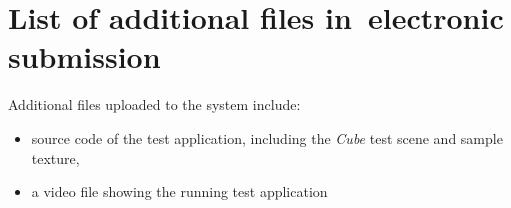 \chapter{List of additional files in~electronic submission}

Additional files uploaded to the system include:
\begin{itemize}
\item source code of the test application, including the \textit{Cube} test scene and sample texture,
\item a video file showing the running test application
\end{itemize}
